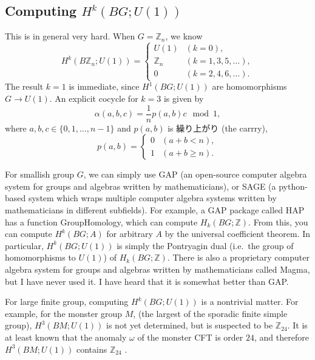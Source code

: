 \documentclass[12pt]{article}
\numberwithin{equation}{section}
\numberwithin{figure}{section}
\theoremstyle{remark}
\def\bZ{\mathbb{Z}}
\begin{document}
\subsection{Computing $H^k(BG;U(1))$}
This is in general very hard. 
When $G=\bZ_n$, we know \begin{equation}
H^k(B\bZ_n;U(1))=\begin{cases}
U(1) & (k=0),\\
\bZ_n & (k=1,3,5,\ldots),\\
0 & (k=2,4,6,\ldots).
\end{cases}
\end{equation} 
The result $k=1$ is immediate, since $H^1(BG;U(1))$ are homomorphisms $G\to U(1)$.
An explicit cocycle for $k=3$ is given by \begin{equation}
\alpha(a,b,c)= \frac{1}n p(a,b) c \mod 1,
\end{equation} where $a,b,c\in \{0,1,\ldots, n-1\}$ and $p(a,b)$ is 繰り上がり (the carrry), \begin{equation}
p(a,b)=\begin{cases}
0 & (a+b < n),\\
1 & (a+b \ge n).
\end{cases}
\end{equation}

For smallish group $G$, we can simply use GAP (an open-source computer algebra system 
for groups and algebras written by mathematicians), or SAGE (a python-based system
which wraps multiple computer algebra systems written by mathematicians in different subfields).
For example, a GAP package called HAP has a function GroupHomology,
which can compute $H_k(BG;\bZ)$. 
From this, you can compute $H^k(BG;A)$ for arbitrary $A$ by the universal coefficient theorem.
In particular, $H^k(BG;U(1))$ is simply the Pontryagin dual (i.e.~the group of
homomorphisms to $U(1)$) of $H_k(BG;\bZ)$.
There is also a proprietary computer algebra system for groups and algebras 
written by mathematicians called Magma, but I have never used it.
I have heard that it is somewhat better than GAP.

For large finite group, computing $H^k(BG;U(1))$ is a nontrivial matter.
For example, for the monster group $M$, (the largest of the sporadic finite simple group),
$H^3(BM;U(1))$ is not yet determined, but is suspected to be $\bZ_{24}$.
It is at least known that the anomaly $\omega$ 
of the monster CFT is order $24$, and therefore $H^3(BM;U(1))$ contains $\bZ_{24}$ \cite{Johnson-Freyd:2017ble}.

\goodbreak
\end{document}
